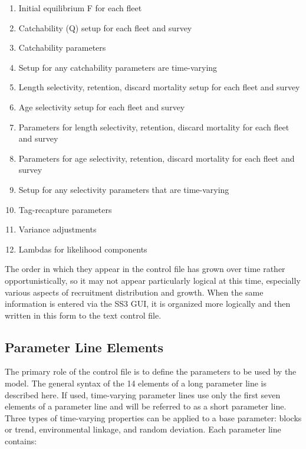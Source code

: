 \begin{enumerate}
		\item Initial equilibrium F for each fleet
		\\
		\item Catchability (Q) setup for each fleet and survey
		\item Catchability parameters
		\item Setup for any catchability parameters are time-varying
		\\
		\item Length selectivity, retention, discard mortality setup for each fleet and survey
		\item Age selectivity setup for each fleet and survey
		\item Parameters for length selectivity, retention, discard mortality for each fleet and survey
		\item Parameters for age selectivity, retention, discard mortality for each fleet and survey
		\item Setup for any selectivity parameters that are time-varying
		\\
		\item Tag-recapture parameters
		\\
		\item Variance adjustments
		\item Lambdas for likelihood components
	\end{enumerate}
The order in which they appear in the control file has grown over time rather opportunistically, so it may not appear particularly logical at this time, especially various aspects of recruitment distribution and growth.  When the same information is entered via the SS3 GUI, it is organized more logically and then written in this form to the text control file.

\subsection{Parameter Line Elements}
The primary role of the control file is to define the parameters to be used by the model.  The general syntax of the 14 elements of a long parameter line is described here.  If used, time-varying parameter lines use only the first seven elements of a parameter line and will be referred to as a short parameter line.  Three types of time-varying properties can be applied to a base parameter:  blocks or trend, environmental linkage, and random deviation.  Each parameter line contains:

